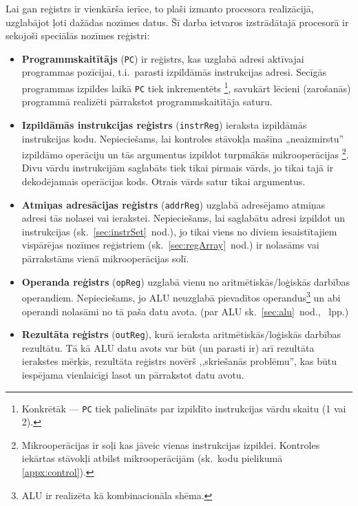 	\pagebreak[2]
	Lai gan reģistrs ir vienkārša ierīce, to plaši izmanto procesora
	realizācijā, uzglabājot ļoti dažādas nozīmes datus.
	Šī darba ietvaros izstrādātajā procesorā ir sekojoši speciālās nozīmes reģistri:
	\pagebreak[1]
	\begin{itemize}
		\item \textbf{Programmskaitītājs} (\texttt{PC}) ir
			reģistrs, kas uzglabā adresi aktīvajai programmas pozīcijai,
			t.i.~parasti izpildāmās instrukcijas adresi. Secīgās programmas
			izpildes laikā \texttt{PC} tiek inkrementēts%
			\footnote{Konkrētāk — \texttt{PC} tiek palielināts par
				izpildīto instrukcijas vārdu skaitu (1 vai 2).},
			savukārt lēcieni (zarošanās)
			programmā realizēti pārrakstot programmskaitītāja saturu.\pagebreak[2]
		\item \textbf{Izpildāmās instrukcijas reģistrs} (\texttt{instrReg})
			ieraksta izpildāmās instrukcijas kodu.
			Nepieciešams, lai kontroles stāvokļa mašīna „neaizmirstu”
			izpildāmo operāciju un tās argumentus izpildot
			turpmākās mikro\-operācijas%
			\footnote{Mikrooperācijas ir soļi kas jāveic vienas instrukcijas
				izpildei. Kontroles iekārtas stāvokļi atbilst mikrooperācijām
				(sk.~kodu pielikumā \ref{appx:control}).}.
			Divu vārdu instrukcijām saglabāts
			tiek tikai pirmais vārds, jo tikai tajā ir dekodējamais
			operācijas kods. Otrais vārds satur tikai argumentus.
		\item \textbf{Atmiņas adresācijas reģistrs} (\texttt{addrReg})
			uzglabā adresējamo atmiņas adresi tās nolasei
			vai ierakstei. Nepieciešams, lai saglabātu adresi izpildot
			 un  instrukcijas (sk.~\ref{sec:instrSet}~nod.),
			jo tikai viens no diviem iesaistītajiem vispārējas nozīmes reģistriem
			(sk.~\ref{sec:regArray}~nod.) ir nolasāms vai pārrakstāms
			vienā mikrooperācijas solī.
		\item \textbf{Operanda reģistrs} (\texttt{opReg})
			uzglabā vienu no aritmētiskās/loģiskās darbības
			ope\-ran\-diem. Nepieciešams, jo ALU neuzglabā pievadītos
			operandus\footnote{ALU ir realizēta kā kombinacionāla shēma.}
			un abi operandi nolasāmi no tā paša datu avota.
			(par ALU sk.~\ref{sec:alu}~nod., \pageref{sec:alu}~lpp.)
		\item \textbf{Rezultāta reģistrs} (\texttt{outReg}),
			kurā ieraksta aritmētiskās/loģiskās darbības rezultātu.
			Tā kā ALU datu avots var būt (un parasti ir) arī rezultāta
			ierakstes mērķis, rezultāta reģistrs novērš 
			,,skriešanās problēmu'', kas būtu
			iespējama vienlaicīgi lasot un pārrakstot datu avotu.
	\end{itemize}

